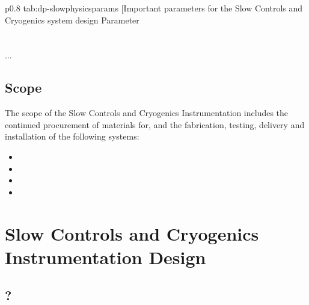 \begin{dunetable}
{p{0.8\textwidth}}
{tab:dp-slowphysicsparams}
{[Important parameters for the Slow Controls and Cryogenics system design}   
Parameter  \\ \toprowrule
  \\ \colhline
   \\ \colhline
 ...\\ 
\end{dunetable}


\subsection{Scope}
\label{sec:fddp-slow-cryo-scope}

The scope of the Slow Controls and Cryogenics Instrumentation includes the continued procurement of materials for, and the fabrication, testing, delivery and installation of the following systems: 


\begin{itemize}
\item 
\item 
\item  
\item 
\end{itemize}



\section{Slow Controls and Cryogenics Instrumentation Design}
\label{sec:fddp-slow-cryo-design}




\subsection{?}
\label{sec:fddp-slow-cryo-?}




